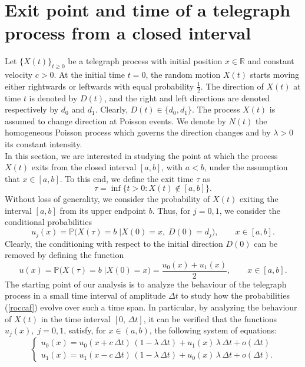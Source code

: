 \documentclass{article}
\begin{document}
\section{Exit point and time of a telegraph process from a closed interval}\label{sec:base}
Let $\{X(t)\}_{t\ge0}$ be a telegraph process with initial position $x\in\mathbb{R}$ and constant velocity $c>0$. At the initial time $t=0$, the random motion $X(t)$ starts moving either rightwards or leftwards with equal probability $\frac{1}{2}$. The direction of $X(t)$ at time $t$ is denoted by $D(t)$, and the right and left directions are denoted respectively by $d_0$ and $d_1$. Clearly, $D(t)\in\{d_0,d_1\}$. The process $X(t)$ is assumed to change direction at Poisson events. We denote by $N(t)$ the homogeneous Poisson process which governs the direction changes and by $\lambda>0$ its constant intensity.\\
\noindent In this section, we are interested in studying the point at which the process $X(t)$ exits from the closed interval $[a,b]$, with $a<b$, under the assumption that $x\in[a,b]$. To this end, we define the exit time $\tau$ as \begin{equation}\label{tau}\tau=\inf\{t>0: X(t)\notin [a,b]\}.\end{equation} Without loss of generality, we consider the probability of $X(t)$ exiting the interval $[a,b]$ from its upper endpoint $b$. Thus, for $j=0,1$, we consider the conditional probabilities
\begin{equation}\label{roccaf}u_j(x)=\mathbb{P}\Big(X(\tau)=b\;\Big\lvert X(0)=x,\; D(0)=d_j\Big),\qquad x\in[a,b].\end{equation}
Clearly, the conditioning with respect to the initial direction $D(0)$ can be removed by defining the function
\begin{equation}\label{u}u(x)=\mathbb{P}\Big(X(\tau)=b\;\Big\lvert X(0)=x\Big)=\frac{u_0(x)+u_1(x)}{2},\qquad x\in[a,b].\end{equation}
The starting point of our analysis is to analyze the behaviour of the telegraph process in a small time interval of amplitude $\Delta t$ to study how the probabilities (\ref{roccaf}) evolve over such a time span. In particular, by analyzing the behaviour of $X(t)$ in the time interval $[0,\,\Delta t]$, it can be verified that the functions $u_j(x),\;j=0,1$, satisfy, for $x\in(a,b)$, the following system of equations:
\begin{equation}\label{ujsys}
\begin{cases}
u_0(x)=u_0(x+c\,\Delta t)\,(1-\lambda\,\Delta t)+u_1(x)\,\lambda\,\Delta t + o(\Delta t)\\
u_1(x)=u_1(x-c\,\Delta t)\,(1-\lambda\,\Delta t)+u_0(x)\,\lambda\,\Delta t + o(\Delta t).
\end{cases}
\end{equation}
\end{document}
